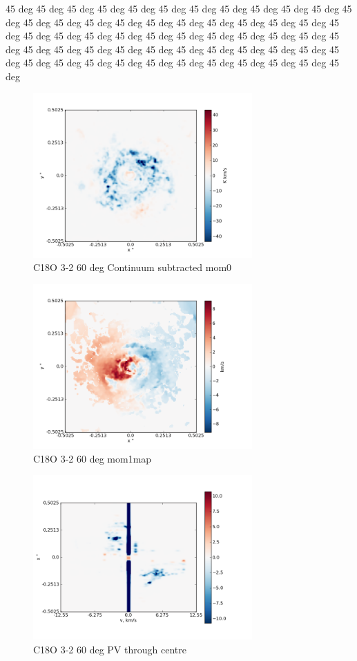 \documentclass[useAMS,usenatbib]{mn2e}
\begin{document}
45 deg 45 deg 45 deg 45 deg 45 deg 45 deg 45 deg 45 deg 45 deg 45 deg 45 deg 45 deg 45 deg 45 deg 45 deg 45 deg 45 deg 45 deg 45 deg 45 deg 45 deg 45 deg 45 deg 45 deg 45 deg 45 deg 45 deg 45 deg 45 deg 45 deg 45 deg 45 deg 45 deg 45 deg 45 deg 45 deg 45 deg 45 deg 45 deg 45 deg 45 deg 45 deg 45 deg 45 deg 45 deg 45 deg 45 deg 45 deg 45 deg 45 deg 45 deg 45 deg 45 deg 45 deg 45 deg 45 deg 

\begin{figure}
 \includegraphics[width=84mm]{Figures/sim/imageC18O_3-2_60deg_contSub.png}

 \caption{C18O 3-2 60 deg Continuum subtracted mom0}
\end{figure}

\begin{figure}
 \includegraphics[width=84mm]{Figures/sim/imageC18O_3-2_60deg_mom1.png}

 \caption{C18O 3-2 60 deg mom1map}
\end{figure}

\begin{figure}
 \includegraphics[width=84mm]{Figures/sim/imageC18O_3-2_60deg_PV_centre.png}

 \caption{C18O 3-2 60 deg PV through centre}
\end{figure}
\end{document}
